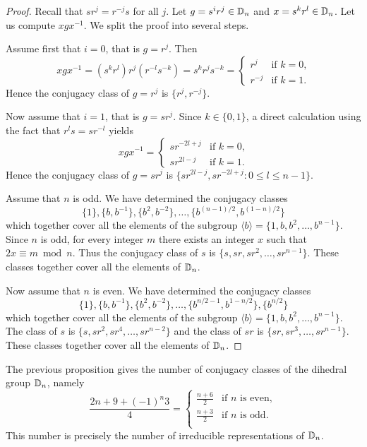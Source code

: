 \begin{proof}
    Recall that $sr^j=r^{-j}s$ for all $j$. Let $g=s^ir^j\in\mathbb{D}_n$ and 
    $x=s^kr^l\in\mathbb{D}_n$. Let us compute $xgx^{-1}$. We split the
    proof into several steps. 

    Assume first that $i=0$, that is $g=r^j$. Then
    \[
    xgx^{-1}=(s^kr^l)r^j(r^{-l}s^{-k})=s^kr^js^{-k}
    =\begin{cases}
        r^j & \text{if $k=0$,}\\
        r^{-j} & \text{if $k=1$.}
    \end{cases}
    \]
    Hence the conjugacy class of $g=r^j$ is $\{r^j,r^{-j}\}$. 

    Now assume that $i=1$, that is $g=sr^j$. Since $k\in\{0,1\}$, a direct
    calculation using the fact that $r^ls=sr^{-l}$ yields 
    \[
    xgx^{-1}=\begin{cases} 
        sr^{-2l+j} & \text{if $k=0$,}\\
        sr^{2l-j} & \text{if $k=1$.}
        \end{cases}
    \]
    Hence the conjugacy class of $g=sr^j$ is $\{sr^{2l-j},sr^{-2l+j}:0\leq l\leq n-1\}$. 

    Assume that $n$ is odd. We have determined the conjugacy classes 
    \[
    \{1\},\{b,b^{-1}\},\{b^2,b^{-2}\},\dots,\{b^{(n-1)/2},b^{(1-n)/2}\}
    \]
    which together cover all the elements of the subgroup 
    $\langle b\rangle=\{1,b,b^2,\dots,b^{n-1}\}$. Since $n$ is odd, for every 
    integer 
    $m$ there exists an integer $x$ such that $2x\equiv m\bmod n$. Thus 
    the conjugacy class of $s$ is $\{s,sr,sr^2,\dots,sr^{n-1}\}$. These classes together cover 
    all the elements of $\mathbb{D}_n$. 
    
    Now assume that $n$ is even. We have determined the conjugacy classes 
    \[
    \{1\},\{b,b^{-1}\},\{b^2,b^{-2}\},\dots,\{b^{n/2-1},b^{1-n/2}\},\{b^{n/2}\}
    \]
    which together cover all the elements of the subgroup 
    $\langle b\rangle=\{1,b,b^2,\dots,b^{n-1}\}$. The class of $s$ is $\{s,sr^2,sr^4,\dots,sr^{n-2}\}$ and 
    the class of $sr$ is $\{sr,sr^3,\dots,sr^{n-1}\}$. These classes together cover 
    all the elements of $\mathbb{D}_n$. 
\end{proof}

The previous proposition gives the number of conjugacy classes of the dihedral group $\mathbb{D}_n$, namely
\[
\frac{2n+9+(-1)^n3}{4}=\begin{cases}
    \frac{n+6}{2} & \text{if $n$ is even},\\
    \frac{n+3}{2} & \text{if $n$ is odd}.\\
\end{cases}
\]
This number is precisely the number of irreducible representations of $\mathbb{D}_n$. 

